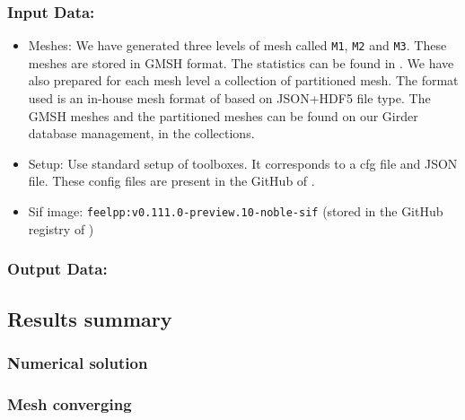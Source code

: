 \subsubsection{Input Data:}
  \begin{itemize}
  \item Meshes: We have generated three levels of mesh called \texttt{M1}, \texttt{M2}
    and \texttt{M3}. These meshes are stored in GMSH format. The statistics can be found in . We have also prepared for
    each mesh level a collection of partitioned mesh.
    The format used is an in-house mesh format of \Feelpp based on
    JSON+HDF5 file type.
    The GMSH meshes and the partitioned meshes can be found on our Girder
    database management, in the \Feelpp collections.
  \item Setup: Use standard setup of \Feelpp toolboxes. It corresponds to a cfg
    file and JSON file. These config files are present in the GitHub of \Feelpp.
  \item Sif image: \texttt{feelpp:v0.111.0-preview.10-noble-sif}  (stored in the GitHub registry of \Feelpp)
  \end{itemize}

\subsubsection{Output Data:}




\subsection{Results summary}



\subsubsection{Numerical solution}




\subsubsection{Mesh converging}

